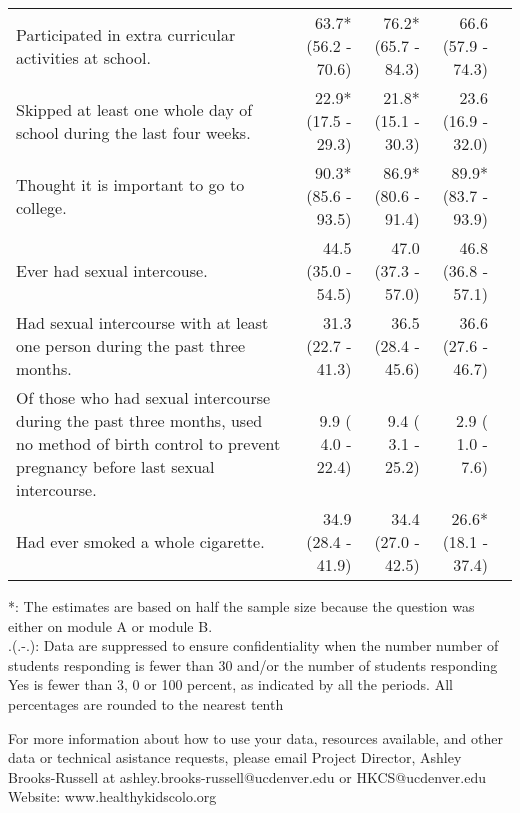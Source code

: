 \documentclass[11pt]{article}
\begin{document}
\begin{longtable}{p{12cm}|rrr|r}
  Participated in extra curricular activities at school. & 63.7*(56.2 - 70.6) & 76.2*(65.7 - 84.3) & 66.6 (57.9 - 74.3) &  \\ 
  Skipped at least one whole day of school during the last four weeks. & 22.9*(17.5 - 29.3) & 21.8*(15.1 - 30.3) & 23.6 (16.9 - 32.0) &  \\ 
  Thought it is important to go to college. & 90.3*(85.6 - 93.5) & 86.9*(80.6 - 91.4) & 89.9*(83.7 - 93.9) &  \\ 
  Ever had sexual intercouse. & 44.5 (35.0 - 54.5) & 47.0 (37.3 - 57.0) & 46.8 (36.8 - 57.1) &  \\ 
  Had sexual intercourse with at least one person during the past three months. & 31.3 (22.7 - 41.3) & 36.5 (28.4 - 45.6) & 36.6 (27.6 - 46.7) &  \\ 
  Of those who had sexual intercourse during the past three months, used no method of birth control to prevent pregnancy before last sexual intercourse. &  9.9 ( 4.0 - 22.4) &  9.4 ( 3.1 - 25.2) &  2.9 ( 1.0 -  7.6) &  \\ 
  Had ever smoked a whole cigarette. & 34.9 (28.4 - 41.9) & 34.4 (27.0 - 42.5) & 26.6*(18.1 - 37.4) &  \\ 
  \hline
\end{longtable}\vspace{-0.4cm}
\begin{footnotesize}
*: The estimates are based on half the sample size because the question was either on module A or module B. \\
 .(.-.): Data are suppressed to ensure confidentiality when the number number of students responding is fewer than 30 and/or the number of students responding Yes is fewer than 3, 0 or 100 percent, as indicated by all the periods. All percentages are rounded to the nearest tenth\\
\end{footnotesize}

\noindent For more information about how to use your data, resources available, and other data or technical asistance requests, please email Project Director, Ashley Brooks-Russell at ashley.brooks-russell@ucdenver.edu or HKCS@ucdenver.edu
\\
\noindent Website: www.healthykidscolo.org
\end{document}
